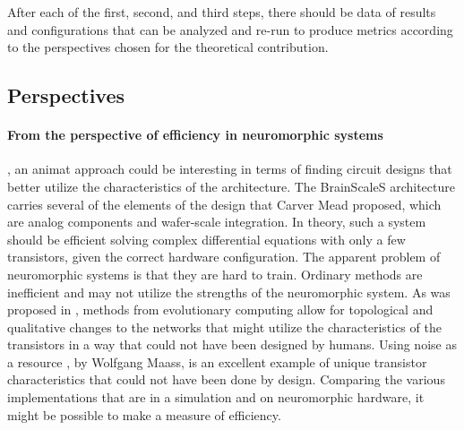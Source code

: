 After each of the first, second, and third steps, there should be data of results and configurations that can be analyzed and re-run to produce metrics according to the perspectives chosen for the theoretical contribution.

\subsection{Perspectives}
\paragraph{From the perspective of efficiency in neuromorphic systems}, an animat approach could be interesting in terms of finding circuit designs that better utilize the characteristics of the architecture.
The BrainScaleS architecture carries several of the elements of the design that Carver Mead proposed, which are analog components and wafer-scale integration.
In theory, such a system should be efficient solving complex differential equations with only a few transistors, given the correct hardware configuration.
The apparent problem of neuromorphic systems is that they are hard to train. Ordinary methods are inefficient and may not utilize the strengths of the neuromorphic system.
As was proposed in \cite{schuman_evolutionary_2016}, methods from evolutionary computing allow for topological and qualitative changes to the networks that might utilize the characteristics of the transistors in a way that could not have been designed by humans.
Using noise as a resource \cite{maass_noise_2014}, by Wolfgang Maass, is an excellent example of unique transistor characteristics that could not have been done by design.
Comparing the various implementations that are in a simulation and on neuromorphic hardware, it might be possible to make a measure of efficiency.

